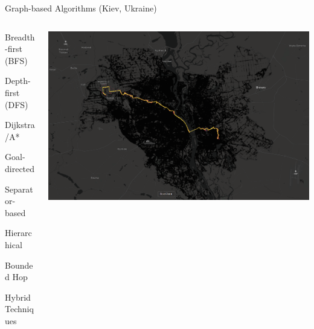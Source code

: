 \documentclass[aspectratio=169]{beamer}
\makeatletter
\newcommand{\white}[1]{{\color{pureminimalistic@text@white} #1}}
\newcommand{\red}[1]{{\color{pureminimalistic@text@red} #1}}
\makeatother
\begin{document}
\begin{frame}[plain]{Graph-based Algorithms \white{(Kiev, Ukraine)}}
  \begin{columns}[T]
      \begin{column}{.4\linewidth}
          \begin{vfilleditems}
              \item {\Large Breadth-first (BFS)}
              \item {\Large Depth-first (DFS)}
              \item {\Large Dijkstra/A*}
              \vspace{1em}
              {\color{grey}
              \item {\Large Goal-directed}
              \item {\Large Separator-based}
              \item {\Large Hierarchical}
              \item {\Large Bounded Hop}
              \item {\Large Hybrid Techniques}
              \vspace{1em}
              }
              \item \red{\Large \cite{bast2016route}}
          \end{vfilleditems}
      \end{column}
      \begin{column}{.6\linewidth}
      \includegraphics[height=0.9\textheight, keepaspectratio, trim={5cm 3cm 12cm 2cm}, clip]{figures/kiev.png}
      \end{column}
  \end{columns}
\end{frame}
\end{document}
